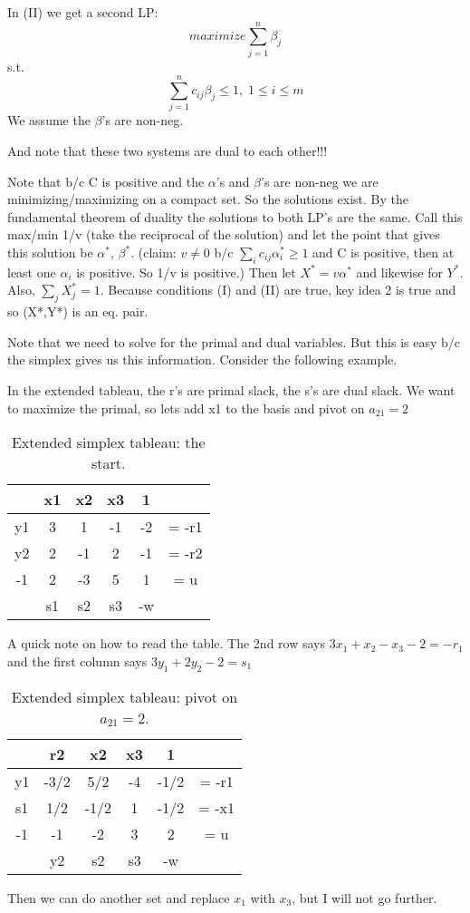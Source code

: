 In (II) we get a second LP:
\[maximize \sum_{j=1}^n \beta_j\]
s.t.
\[\sum_{j=1}^n c_{ij}\beta_j \leq 1,\; 1 \leq i \leq m\]
We assume the $\beta$'s are non-neg.

And note that these two systems are dual to each other!!!

Note that b/c C is positive and the $\alpha$'s and $\beta$'s are non-neg we are minimizing/maximizing on a compact set. So the solutions exist. By the fundamental theorem of duality the solutions to both LP's are the same. Call this max/min 1/v (take the reciprocal of the solution) and let the point that gives this solution be $\alpha^*$, $\beta^*$. (claim: $v\neq 0$ b/c $\sum_i c_{ij}\alpha_i^* \geq 1$ and C is positive, then at least one $\alpha_i$ is positive. So 1/v is positive.) Then let $X^* = v\alpha^*$ and likewise for $Y^*$. Also, $\sum_j X^*_j = 1$. Because conditions (I) and (II) are true, key idea 2 is true and so (X*,Y*) is an eq. pair.

Note that we need to solve for the primal and dual variables. But this is easy b/c the simplex gives us this information. Consider the following example. 


\begin{example}
In the  extended tableau, the r's are primal slack, the s's are dual slack. We want to maximize the primal, so lets add x1 to the basis and pivot on $a_{21}=2$
\begin{table}
\caption{Extended simplex tableau: the start.}
\begin{tabular}{c | c | c | c | c | c}
\toprule 
      & x1  & x2   & x3    & 1  &  \\ \hline
y1   & 3    & 1    & -1    & -2 & = -r1 \\
y2   & 2    &-1    &  2    & -1 & = -r2 \\ \hline
-1   & 2    &-3    &  5    &  1 & = u  \\ \hline
      & s1   & s2   & s3   &-w & 	\\
\bottomrule
\end{tabular}
\end{table}

A quick note on how to read the table. The 2nd row says $3x_1 +x_2 -x_3 -2 = -r_1$ and the first column says $3y_1 + 2y_2 -2 = s_1$

\begin{table}
\caption{Extended simplex tableau: pivot on $a_{21}=2$.}
\begin{tabular}{c | c | c | c | c | c}
\toprule 
      & r2  & x2   & x3    & 1  &  \\ \hline
y1   & -3/2  & 5/2    & -4    & -1/2 & = -r1 \\
s1   & 1/2    &-1/2    &  1    & -1/2 & = -x1 \\ \hline
-1   & -1    &-2    &  3    &  2 & = u  \\ \hline
      & y2   & s2   & s3   &-w & 	\\
\bottomrule
\end{tabular}
\end{table}

Then we can do another set and replace $x_1$ with $x_3$, but I will not go further. 
\end{example}

